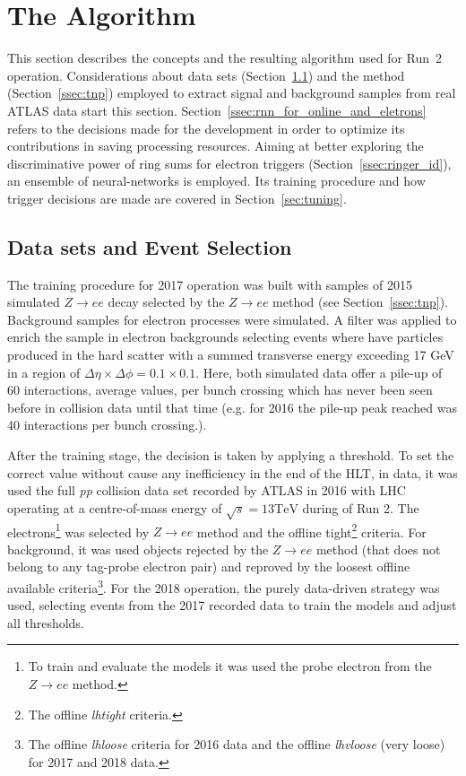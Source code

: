 \chapter{The \rnn{} Algorithm}%
\label{sec:neuralringer}

This section describes the \rnn{} concepts and the resulting algorithm used for Run~2
operation. Considerations about data sets (Section~\ref{ssec:dataset}) and the \TnP method
(Section~\ref{ssec:tnp}) employed to extract signal and background samples
from real ATLAS data start this section. Section~\ref{ssec:rnn_for_online_and_eletrons} refers to the
decisions made for the \rnn{} development in order to optimize its contributions in saving processing resources. Aiming at better exploring the discriminative
power of ring sums for electron triggers (Section~\ref{ssec:ringer_id}),
an ensemble of neural-networks is employed. Its training procedure and how trigger decisions are made are covered in Section~\ref{sec:tuning}.




\section{Data sets and Event Selection}%
\label{ssec:dataset}

The training procedure for 2017 operation was built with samples of 2015 simulated $Z\rightarrow ee$ decay selected by the $Z\rightarrow ee$ \TnP method (see Section~\ref{ssec:tnp}). Background samples for electron processes were simulated. A filter was applied to enrich the sample in electron backgrounds selecting events where have particles produced in the hard scatter with a summed transverse energy exceeding 17 GeV in a region of $\Delta\eta\times\Delta\phi=0.1\times0.1$. Here, both simulated data offer a pile-up of 60 interactions, average values, per bunch crossing which has never been seen before in collision data until that time (e.g. for 2016 the pile-up peak reached was 40 interactions per bunch crossing.).

After the training stage, the decision is taken by applying a threshold. To set the correct value without cause any inefficiency in the end of the HLT, in data, it was used the full \textit{pp} collision data set recorded by ATLAS in 2016 with LHC operating at a centre-of-mass energy of $\sqrt{s}=13 \text{TeV}$ during of Run 2. The electrons\footnote{To train and evaluate the models it was used the probe electron from the $Z\rightarrow ee$ \TnP method.} was selected by $Z\rightarrow ee$ \TnP method and the offline tight\footnote{The offline \textit{lhtight} criteria.} criteria. For background, it was used objects rejected by the $Z\rightarrow ee$ \TnP method (that does not belong to any tag-probe electron pair) and reproved by the loosest offline available criteria\footnote{The offline \textit{lhloose} criteria for 2016 data and the offline \textit{lhvloose} (very loose) for 2017 and 2018 data.}. For the 2018 operation, the purely data-driven strategy was used, selecting events from the 2017 recorded data to train the models and adjust all thresholds.

